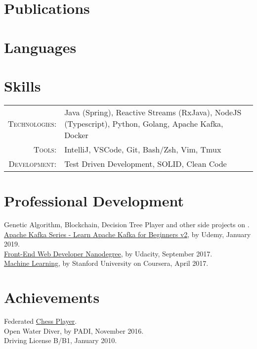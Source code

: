 \section{Publications}

\newpage

\section{Languages}

\section{Skills}
\begin{tabular}{r p{12.5cm}}
\textsc{Technologies:} & Java (Spring), Reactive Streams (RxJava), NodeJS (Typescript), Python, Golang, Apache Kafka, Docker\\
\textsc{Tools:} & IntelliJ, VSCode, Git, Bash/Zsh, Vim, Tmux\\
\textsc{Development:} & Test Driven Development, SOLID, Clean Code
\end{tabular}

\section{Professional Development}
\noindent
\bulletS Genetic Algorithm, Blockchain, Decision Tree Player and other side projects on \gitHubNoUrl{}.\\
\bulletS \href{https://brunoroque06.github.io/documents/certificates/KafkaUdemy.pdf}{Apache Kafka Series - Learn Apache Kafka for Beginners v2}, by Udemy, January 2019.\\
\bulletS \href{https://brunoroque06.github.io/documents/certificates/FrontEndUdacity.pdf}{Front-End Web Developer Nanodegree}, by Udacity, September 2017.\\
\bulletS \href{https://brunoroque06.github.io/documents/certificates/MachineLearningCoursera.pdf}{Machine Learning}, by Stanford University on Coursera, April 2017. %

\section{Achievements}
\noindent
\bulletS Federated \href{http://ratings.fide.com/card.phtml?event=1958720}{Chess Player}.\\
\bulletS Open Water Diver, by PADI, November 2016.\\
\bulletS Driving License B/B1, January 2010.
